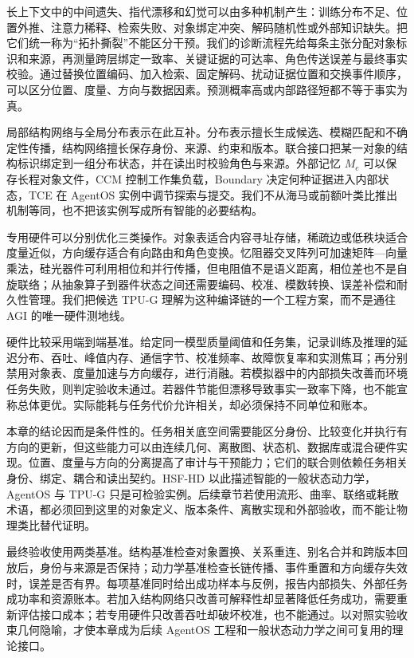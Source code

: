 长上下文中的中间遗失、指代漂移和幻觉可以由多种机制产生：训练分布不足、位置外推、注意力稀释、检索失败、对象绑定冲突、解码随机性或外部知识缺失。把它们统一称为“拓扑撕裂”不能区分干预。我们的诊断流程先给每条主张分配对象标识和来源，再测量跨层绑定一致率、关键证据的可达率、角色传送误差与最终事实校验。通过替换位置编码、加入检索、固定解码、扰动证据位置和交换事件顺序，可以区分位置、度量、方向与数据因素。预测概率高或内部路径短都不等于事实为真。

局部结构网络与全局分布表示在此互补。分布表示擅长生成候选、模糊匹配和不确定性传播，结构网络擅长保存身份、来源、约束和版本。联合接口把某一对象的结构标识绑定到一组分布状态，并在读出时校验角色与来源。外部记忆 $M_e$ 可以保存长程对象文件，CCM 控制工作集负载，Boundary 决定何种证据进入内部状态，TCE 在 AgentOS 实例中调节探索与提交。我们不从海马或前额叶类比推出机制等同，也不把该实例写成所有智能的必要结构。

专用硬件可以分别优化三类操作。对象表适合内容寻址存储，稀疏边或低秩块适合度量近似，方向缓存适合有向路由和角色变换。忆阻器交叉阵列可加速矩阵—向量乘法，硅光器件可利用相位和并行传播，但电阻值不是语义距离，相位差也不是自旋联络；从抽象算子到器件状态之间还需要编码、校准、模数转换、误差补偿和耐久性管理。我们把候选 TPU-G 理解为这种编译链的一个工程方案，而不是通往 AGI 的唯一硬件测地线。

硬件比较采用端到端基准。给定同一模型质量阈值和任务集，记录训练及推理的延迟分布、吞吐、峰值内存、通信字节、校准频率、故障恢复率和实测焦耳；再分别禁用对象表、度量加速与方向缓存，进行消融。若模拟器中的内部损失改善而环境任务失败，则判定验收未通过。若器件节能但漂移导致事实一致率下降，也不能宣称总体更优。实际能耗与任务代价允许相关，却必须保持不同单位和账本。

本章的结论因而是条件性的。任务相关底空间需要能区分身份、比较变化并执行有方向的更新，但这些能力可以由连续几何、离散图、状态机、数据库或混合硬件实现。位置、度量与方向的分离提高了审计与干预能力；它们的联合则依赖任务相关身份、绑定、耦合和读出契约。HSF-HD 以此描述智能的一般状态动力学，AgentOS 与 TPU-G 只是可检验实例。后续章节若使用流形、曲率、联络或耗散术语，都必须回到这里的对象定义、版本条件、离散实现和外部验收，而不能让物理类比替代证明。

最终验收使用两类基准。结构基准检查对象置换、关系重连、别名合并和跨版本回放后，身份与来源是否保持；动力学基准检查长链传播、事件重置和方向缓存失效时，误差是否有界。每项基准同时给出成功样本与反例，报告内部损失、外部任务成功率和资源账本。若加入结构网络只改善可解释性却显著降低任务成功，需要重新评估接口成本；若专用硬件只改善吞吐却破坏校准，也不能通过。以对照实验收束几何隐喻，才使本章成为后续 AgentOS 工程和一般状态动力学之间可复用的理论接口。

